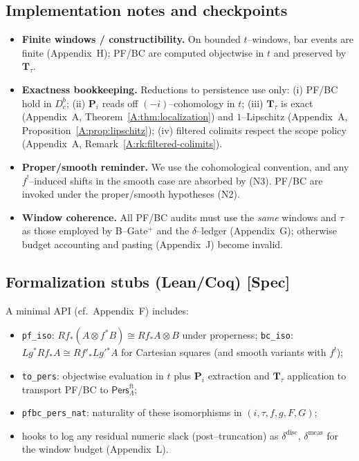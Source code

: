 \documentclass[11pt]{article}
\newcommand{\Pers}{\mathsf{Pers}}
\numberwithin{equation}{section}
\theoremstyle{definition}
\begin{document}
\subsection{Implementation notes and checkpoints}
\label{N:impl}
\begin{itemize}\itemsep0.35em
  \item \textbf{Finite windows / constructibility.} On bounded \(t\)–windows, bar events are finite (Appendix~H); PF/BC are computed objectwise in \(t\) and preserved by \(\mathbf{T}_\tau\).
  \item \textbf{Exactness bookkeeping.} Reductions to persistence use only: (i) PF/BC hold in \(D^b_c\); (ii) \(\mathbf{P}_i\) reads off \((-i)\)–cohomology in \(t\); (iii) \(\mathbf{T}_\tau\) is exact (Appendix~A, Theorem~\ref{A:thm:localization}) and \(1\)–Lipschitz (Appendix~A, Proposition~\ref{A:prop:lipschitz}); (iv) filtered colimits respect the scope policy (Appendix~A, Remark~\ref{A:rk:filtered-colimits}).
  \item \textbf{Proper/smooth reminder.} We use the cohomological convention, and any \(f^!\)–induced shifts in the smooth case are absorbed by (N3). PF/BC are invoked under the proper/smooth hypotheses (N2).
  \item \textbf{Window coherence.} All PF/BC audits must use the \emph{same} windows and \(\tau\) as those employed by B–Gate\(^{+}\) and the \(\delta\)–ledger (Appendix~G); otherwise budget accounting and pasting (Appendix~J) become invalid.
\end{itemize}

\subsection{Formalization stubs (Lean/Coq) [Spec]}
\label{N:formal}
A minimal API (cf.\ Appendix~F) includes:
\begin{itemize}\itemsep0.25em
  \item \texttt{pf\_iso}: \(Rf_\ast(A\otimes f^\ast B)\cong Rf_\ast A\otimes B\) under properness; \texttt{bc\_iso}: \(Lg^\ast Rf_\ast A\cong Rf'_\ast Lg'{}^\ast A\) for Cartesian squares (and smooth variants with \(f^!\));
  \item \texttt{to\_pers}: objectwise evaluation in \(t\) plus \(\mathbf{P}_i\) extraction and \(\mathbf{T}_\tau\) application to transport PF/BC to \(\Pers^{\mathrm{ft}}_\Lambda\);
  \item \texttt{pfbc\_pers\_nat}: naturality of these isomorphisms in \((i,\tau,f,g,F,G)\);
  \item hooks to log any residual numeric slack (post–truncation) as \(\delta^{\mathrm{disc}}\), \(\delta^{\mathrm{meas}}\) for the window budget (Appendix~L).
\end{itemize}
\end{document}
